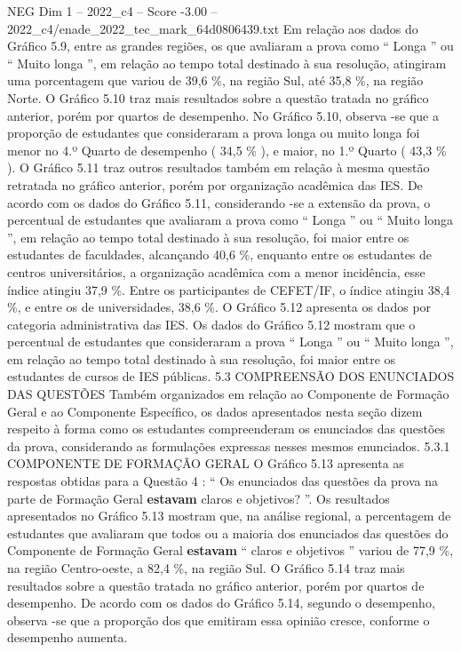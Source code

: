 \begin{textsample}{NEG Dim 1 – 2022\_c4 – Score -3.00 – 2022\_c4/enade\_2022\_tec\_mark\_64d0806439.txt}
Em relação aos dados do Gráfico 5.9, entre as grandes regiões, os que avaliaram a prova como “ Longa ” ou “ Muito longa ”, em relação ao tempo total destinado à sua resolução, atingiram uma porcentagem que variou de 39,6 \%, na região Sul, até 35,8 \%, na região Norte.
O Gráfico 5.10 traz mais resultados sobre a questão tratada no gráfico anterior, porém por quartos de desempenho.
No Gráfico 5.10, observa -se que a proporção de estudantes que consideraram a prova longa ou muito longa foi menor no 4.º Quarto de desempenho ( 34,5 \% ), e maior, no 1.º Quarto ( 43,3 \% ).
O Gráfico 5.11 traz outros resultados também em relação à mesma questão retratada no gráfico anterior, porém por organização acadêmica das IES.
De acordo com os dados do Gráfico 5.11, considerando -se a extensão da prova, o percentual de estudantes que avaliaram a prova como “ Longa ” ou “ Muito longa ”, em relação ao tempo total destinado à sua resolução, foi maior entre os estudantes de faculdades, alcançando 40,6 \%, enquanto entre os estudantes de centros universitários, a organização acadêmica com a menor incidência, esse índice atingiu 37,9 \%.
Entre os participantes de CEFET/IF, o índice atingiu 38,4 \%, e entre os de universidades, 38,6 \%.
O Gráfico 5.12 apresenta os dados por categoria administrativa das IES.
Os dados do Gráfico 5.12 mostram que o percentual de estudantes que consideraram a prova “ Longa ” ou “ Muito longa ”, em relação ao tempo total destinado à sua resolução, foi maior entre os estudantes de cursos de IES públicas. 5.3 COMPREENSÃO DOS ENUNCIADOS DAS QUESTÕES Também organizados em relação ao Componente de Formação Geral e ao Componente Específico, os dados apresentados nesta seção dizem respeito à forma como os estudantes compreenderam os enunciados das questões da prova, considerando as formulações expressas nesses mesmos enunciados. 5.3.1 COMPONENTE DE FORMAÇÃO GERAL O Gráfico 5.13 apresenta as respostas obtidas para a Questão 4 : “ Os enunciados das questões da prova na parte de Formação Geral \textbf{estavam} claros e objetivos? ”.
Os resultados apresentados no Gráfico 5.13 mostram que, na análise regional, a percentagem de estudantes que avaliaram que todos ou a maioria dos enunciados das questões do Componente de Formação Geral \textbf{estavam} “ claros e objetivos ” variou de 77,9 \%, na região Centro-oeste, a 82,4 \%, na região Sul.
O Gráfico 5.14 traz mais resultados sobre a questão tratada no gráfico anterior, porém por quartos de desempenho.
De acordo com os dados do Gráfico 5.14, segundo o desempenho, observa -se que a proporção dos que emitiram essa opinião cresce, conforme o desempenho aumenta.

\end{textsample}
